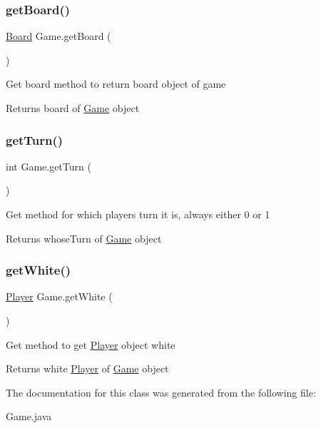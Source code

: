\subsubsection{\texorpdfstring{getBoard()}{getBoard()}}
{\footnotesize\ttfamily \mbox{\hyperlink{class_board}{Board}} Game.\+get\+Board (\begin{DoxyParamCaption}{ }\end{DoxyParamCaption})\hspace{0.3cm}{\ttfamily [inline]}}

Get board method to return board object of game \begin{DoxyReturn}{Returns}
board of \mbox{\hyperlink{class_game}{Game}} object 
\end{DoxyReturn}
\mbox{\label{class_game_ae518e278826e5feba6f9fc5f3818ad02}} 
\subsubsection{\texorpdfstring{getTurn()}{getTurn()}}
{\footnotesize\ttfamily int Game.\+get\+Turn (\begin{DoxyParamCaption}{ }\end{DoxyParamCaption})\hspace{0.3cm}{\ttfamily [inline]}}

Get method for which player\textquotesingle{}s turn it is, always either 0 or 1 \begin{DoxyReturn}{Returns}
whose\+Turn of \mbox{\hyperlink{class_game}{Game}} object 
\end{DoxyReturn}
\mbox{\label{class_game_a142d43f52974f44f3ef110a9a14c8db2}} 
\subsubsection{\texorpdfstring{getWhite()}{getWhite()}}
{\footnotesize\ttfamily \mbox{\hyperlink{class_player}{Player}} Game.\+get\+White (\begin{DoxyParamCaption}{ }\end{DoxyParamCaption})\hspace{0.3cm}{\ttfamily [inline]}}

Get method to get \mbox{\hyperlink{class_player}{Player}} object white \begin{DoxyReturn}{Returns}
white \mbox{\hyperlink{class_player}{Player}} of \mbox{\hyperlink{class_game}{Game}} object 
\end{DoxyReturn}


The documentation for this class was generated from the following file\+:\begin{DoxyCompactItemize}
\item 
Game.\+java\end{DoxyCompactItemize}
